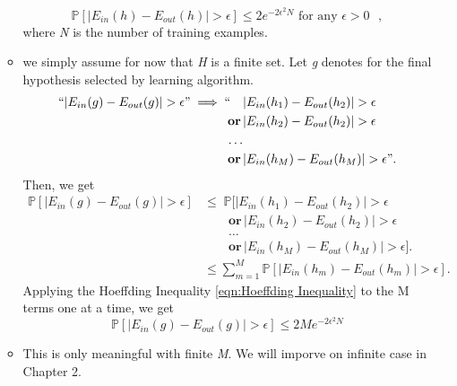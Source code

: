 \begin{itemize}[noitemsep, topsep=0pt]
\begin{itemize}[noitemsep, topsep=0pt]
            \begin{equation}
                \mathbb{P}[|E_{in}(h) - E_{out}(h)| > \epsilon] \leq 2e^{-2\epsilon^2N} \text{ for any $\epsilon > 0$ },
            \end{equation}
            where \textit{N} is the number of training examples.
        \item we simply assume for now that \textit{H} is a finite set. Let \textit{g} denotes for the final hypothesis selected by learning algorithm.
            \begin{equation}
            \begin{aligned}
                ``|E_{in}(g) - E_{out}(g)| > \epsilon " \implies `` \quad & |E_{in}(h_1) - E_{out}(h_2)| > \epsilon \\
                \mathbf{or} \, & |E_{in}(h_2) - E_{out}(h_2)| > \epsilon \\
                \ldots \\
                \mathbf{or} \, & |E_{in}(h_M) - E_{out}(h_M)| > \epsilon".
            \end{aligned}
            \end{equation}
            Then, we get
            \begin{equation}
            \begin{aligned}
                \mathbb{P}[|E_{in}(g) - E_{out}(g)| > \epsilon] & \leq \; \mathbb{P} [ |E_{in}(h_1) - E_{out}(h_2)| > \epsilon \\ 
                & \qquad \mathbf{or} \, |E_{in}(h_2) - E_{out}(h_2)| > \epsilon \\
                & \qquad \ldots \\
                & \qquad \mathbf{or} \, |E_{in}(h_M) - E_{out}(h_M)| > \epsilon ]. \\
                & \leq \sum_{m=1}^{M} \mathbb{P}[|E_{in}(h_m) - E_{out}(h_m)| > \epsilon].
            \end{aligned}
            \end{equation}
            Applying the Hoeffding Inequality \ref{eqn:Hoeffding Inequality} to the M terms one at a time, we get
            \begin{equation}
                \mathbb{P}[|E_{in}(g) - E_{out}(g)| > \epsilon] \leq 2Me^{-2\epsilon^2N}
            \end{equation}
        \item This is only meaningful with finite \textit{M}. We will imporve on infinite case in Chapter 2.

    \end{itemize}
\end{itemize}


